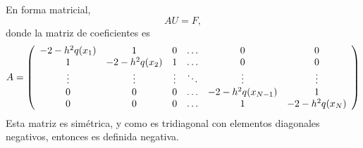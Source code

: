\documentclass[11pt]{report}
\begin{document}
\begin{enumerate}
    En forma matricial,
    \[AU=F,\]
    donde la matriz de coeficientes es
    \[A =\left(\begin{array}{cccccc}
        -2-h^2q(x_1) & 1 & 0 & \mathellipsis & 0 & 0 \\
        1 & -2-h^2q(x_2) & 1 & \mathellipsis & 0 & 0 \\
        \vdots & \vdots & \vdots & \ddots & \vdots & \vdots \\
        0 & 0 & 0 & \mathellipsis & -2-h^2q(x_{N-1}) & 1 \\
        0 & 0 & 0 & \mathellipsis & 1 & -2-h^2q(x_N)
    \end{array}\right)\]
    Esta matriz es simétrica, y como es tridiagonal con elementos diagonales negativos, entonces es definida negativa.
\end{enumerate}
\end{document}
